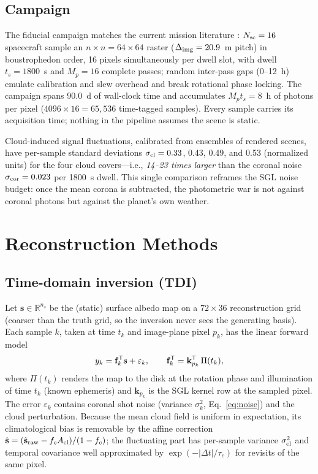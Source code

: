 ﻿\documentclass[twocolumn]{emulateapj}
\begin{document}
\subsection{Campaign}
The fiducial campaign matches the current mission literature
\citep{tt22mnras,helvajian23,tur26bench}: $N_{\rm sc}=16$ spacecraft
sample an $n\times n=64\times64$ raster ($\Delta_{\rm img}=20.9$~m
pitch) in boustrophedon order, 16 pixels simultaneously per dwell slot,
with dwell $t_s=1800$~s and $M_p=16$ complete passes; random
inter-pass gaps (0--12~h) emulate calibration and slew overhead and
break rotational phase locking. The campaign spans 90.0~d of wall-clock
time and accumulates $M_p t_s=8$~h of photons per pixel
($4096\times16=65{,}536$ time-tagged samples). Every sample carries its
acquisition time; nothing in the pipeline assumes the scene is static.

Cloud-induced signal fluctuations, calibrated from ensembles of rendered
scenes, have per-sample standard deviations
$\sigma_{\rm cl}=0.33$, 0.43, 0.49, and 0.53 (normalized units) for the
four cloud covers---i.e., {\it 14--23 times larger} than the coronal
noise $\sigma_{\rm cor}=0.023$ per 1800~s dwell. This single comparison
reframes the SGL noise budget: once the mean corona is subtracted,
the photometric war is not against coronal photons but against the
planet's own weather.

\section{Reconstruction Methods}
\label{sec:methods}

\subsection{Time-domain inversion (TDI)}
Let $\mathbf{s}\in\mathbb{R}^{n_s}$ be the (static) surface albedo map on
a $72\times36$ reconstruction grid (coarser than the truth grid, so the
inversion never sees the generating basis). Each sample $k$, taken at
time $t_k$ and image-plane pixel $p_k$, has the linear forward model
\begin{equation}
y_k=\mathbf{f}_k^{\sf T}\mathbf{s}+\varepsilon_k,\qquad
\mathbf{f}_k^{\sf T}=\mathbf{k}_{p_k}^{\sf T}\,\Pi(t_k),
\label{eq:forward}
\end{equation}
where $\Pi(t_k)$ renders the map to the disk at the rotation phase and
illumination of time $t_k$ (known ephemeris) and
$\mathbf{k}_{p_k}$ is the SGL kernel row at the sampled pixel. The error
$\varepsilon_k$ contains coronal shot noise (variance $\sigma_k^2$,
Eq.~\ref{eq:noise}) and the cloud perturbation. Because the mean cloud
field is uniform in expectation, its climatological bias is removable by
the affine correction
$\hat{\mathbf{s}}=(\hat{\mathbf{s}}_{\rm raw}-f_cA_{\rm cl})/(1-f_c)$;
the fluctuating part has per-sample variance $\sigma_{\rm cl}^2$ and
temporal covariance well approximated by
$\exp(-|\Delta t|/\tau_c)$ for revisits of the same pixel.
\end{document}
